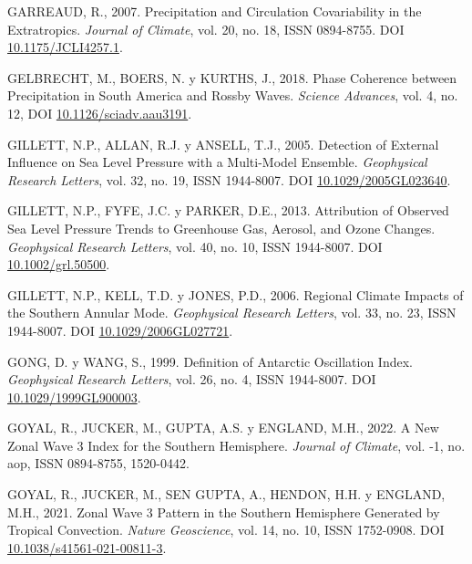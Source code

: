 \documentclass[12pt,oneside,a4paper]{reedthesis}
\newlength{\cslhangindent}
\newenvironment{CSLReferences}[2] %
 {%
  \setlength{\parindent}{0pt}
  \ifodd #1 \everypar{\setlength{\hangindent}{\cslhangindent}}\ignorespaces\fi
  \ifnum #2 > 0
  \setlength{\parskip}{#2\baselineskip}
  \fi
 }%
 {}
\begin{document}
\begin{CSLReferences}{1}{0}
\leavevmode{}%
GARREAUD, R., 2007. Precipitation and {Circulation Covariability} in the {Extratropics}. \emph{Journal of Climate}, vol. 20, no. 18, ISSN 0894-8755. DOI \href{https://doi.org/10.1175/JCLI4257.1}{10.1175/JCLI4257.1}.

\leavevmode{}%
GELBRECHT, M., BOERS, N. y KURTHS, J., 2018. Phase Coherence between Precipitation in {South America} and {Rossby} Waves. \emph{Science Advances}, vol. 4, no. 12, DOI \href{https://doi.org/10.1126/sciadv.aau3191}{10.1126/sciadv.aau3191}.

\leavevmode{}%
GILLETT, N.P., ALLAN, R.J. y ANSELL, T.J., 2005. Detection of External Influence on Sea Level Pressure with a Multi-Model Ensemble. \emph{Geophysical Research Letters}, vol. 32, no. 19, ISSN 1944-8007. DOI \href{https://doi.org/10.1029/2005GL023640}{10.1029/2005GL023640}.

\leavevmode{}%
GILLETT, N.P., FYFE, J.C. y PARKER, D.E., 2013. Attribution of Observed Sea Level Pressure Trends to Greenhouse Gas, Aerosol, and Ozone Changes. \emph{Geophysical Research Letters}, vol. 40, no. 10, ISSN 1944-8007. DOI \href{https://doi.org/10.1002/grl.50500}{10.1002/grl.50500}.

\leavevmode{}%
GILLETT, N.P., KELL, T.D. y JONES, P.D., 2006. Regional Climate Impacts of the {Southern Annular Mode}. \emph{Geophysical Research Letters}, vol. 33, no. 23, ISSN 1944-8007. DOI \href{https://doi.org/10.1029/2006GL027721}{10.1029/2006GL027721}.

\leavevmode{}%
GONG, D. y WANG, S., 1999. Definition of {Antarctic Oscillation} Index. \emph{Geophysical Research Letters}, vol. 26, no. 4, ISSN 1944-8007. DOI \href{https://doi.org/10.1029/1999GL900003}{10.1029/1999GL900003}.

\leavevmode{}%
GOYAL, R., JUCKER, M., GUPTA, A.S. y ENGLAND, M.H., 2022. A New Zonal Wave 3 Index for the {Southern Hemisphere}. \emph{Journal of Climate}, vol. -1, no. aop, ISSN 0894-8755, 1520-0442.

\leavevmode{}%
GOYAL, R., JUCKER, M., SEN GUPTA, A., HENDON, H.H. y ENGLAND, M.H., 2021. Zonal Wave 3 Pattern in the {Southern Hemisphere} Generated by Tropical Convection. \emph{Nature Geoscience}, vol. 14, no. 10, ISSN 1752-0908. DOI \href{https://doi.org/10.1038/s41561-021-00811-3}{10.1038/s41561-021-00811-3}.


\end{CSLReferences}
\end{document}
